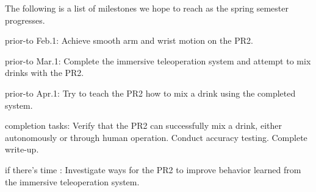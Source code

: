 \documentclass{sig-alternate}
\begin{document}
The following is a list of milestones we hope to reach as the spring semester progresses.
\begin{itemize*}
	\item {\sc prior-to Feb.1}: Achieve smooth arm and wrist motion on the PR2.\vspace{3pt}
	\item {\sc prior-to Mar.1}: Complete the immersive teleoperation system and attempt to mix drinks with the PR2.\vspace{3pt}
	\item {\sc prior-to Apr.1}: Try to teach the PR2 how to mix a drink using the completed system.\vspace{3pt}
	\item {\sc completion tasks}: Verify that the PR2 can successfully mix a drink, either autonomously or through human operation. Conduct accuracy testing. Complete write-up.\vspace{3pt}
	\item {\sc if there's time} : Investigate ways for the PR2 to improve behavior learned from the immersive teleoperation system.
\end{itemize*}

\end{document}
